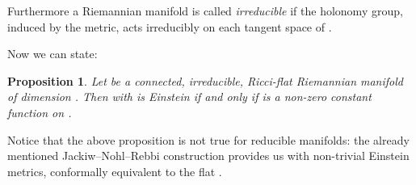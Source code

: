 \documentclass[a4paper,12pt,draft]{article}
\newtheorem{proposition}[theorem]{Proposition}
\begin{document}
Furthermore a Riemannian manifold \coordHE{} is called {\it irreducible} if 
the holonomy group, induced by the metric, acts irreducibly on each
tangent space of \coordHE{}. 

Now we can state:

\begin{proposition} 
Let \coordHE{} be a connected, irreducible, Ricci-flat Riemannian
manifold of dimension \coordHE{}. Then \coordHE{} with
\coordHE{} is Einstein if and only if \myHighlight{$\varphi$}\coordHE{} is a
non-zero constant function on \coordHE{}. 
\end{proposition}

 Notice that the above proposition is not true
for reducible manifolds: the already mentioned Jackiw--Nohl--Rebbi
construction \cite{jac-noh-reb} provides us with non-trivial Einstein metrics,
conformally equivalent to the flat \coordHE{}. 
\vspace{0.1in}
\end{document}
